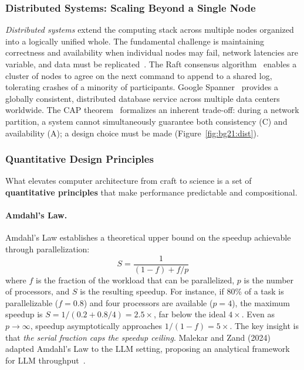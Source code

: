 \subsubsection{Distributed Systems: Scaling Beyond a Single Node}

\textit{Distributed systems} extend the computing stack across multiple nodes organized into a logically unified whole.
The fundamental challenge is maintaining correctness and availability when individual nodes may fail, network latencies are variable, and data must be replicated~\cite{cap2002}.
The Raft consensus algorithm~\cite{raft2014} enables a cluster of nodes to agree on the next command to append to a shared log, tolerating crashes of a minority of participants.
Google Spanner~\cite{spanner2012} provides a globally consistent, distributed database service across multiple data centers worldwide.
The CAP theorem~\cite{cap2002} formalizes an inherent trade-off: during a network partition, a system cannot simultaneously guarantee both consistency (C) and availability (A); a design choice must be made (Figure~\ref{fig:bg21:dist}).


\subsubsection{Quantitative Design Principles}

What elevates computer architecture from craft to science is a set of \textbf{quantitative principles} that make performance predictable and compositional.

\paragraph{Amdahl's Law.}
Amdahl's Law establishes a theoretical upper bound on the speedup achievable through parallelization:
\begin{equation}
\label{eq:amdahl}
S = \frac{1}{(1-f) + f/p}
\end{equation}
where $f$ is the fraction of the workload that can be parallelized, $p$ is the number of processors, and $S$ is the resulting speedup.
For instance, if 80\% of a task is parallelizable ($f=0.8$) and four processors are available ($p=4$), the maximum speedup is $S = 1/(0.2 + 0.8/4) = 2.5\times$, far below the ideal $4\times$.
Even as $p \to \infty$, speedup asymptotically approaches $1/(1-f) = 5\times$.
The key insight is that \emph{the serial fraction caps the speedup ceiling}.
Malekar and Zand (2024) adapted Amdahl's Law to the LLM setting, proposing an analytical framework for LLM throughput~\cite{malekar2024amdahlllm}.

